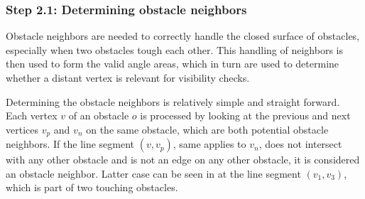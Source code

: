		\subsubsection{Step 2.1: Determining obstacle neighbors}
			
			Obstacle neighbors are needed to correctly handle the closed surface of obstacles, especially when two obstacles tough each other.
			This handling of neighbors is then used to form the valid angle areas, which in turn are used to determine whether a distant vertex is relevant for visibility checks.
			
			Determining the obstacle neighbors is relatively simple and straight forward.
			Each vertex $v$ of an obstacle $o$ is processed by looking at the previous and next vertices $v_p$ and $v_n$ on the same obstacle, which are both potential obstacle neighbors.
			If the line segment $(v, v_p)$, same applies to $v_n$, does not intersect with any other obstacle and is not an edge on any other obstacle, it is considered an obstacle neighbor.
			Latter case can be seen in  at the line segment $(v_1, v_3)$, which is part of two touching obstacles.
						
